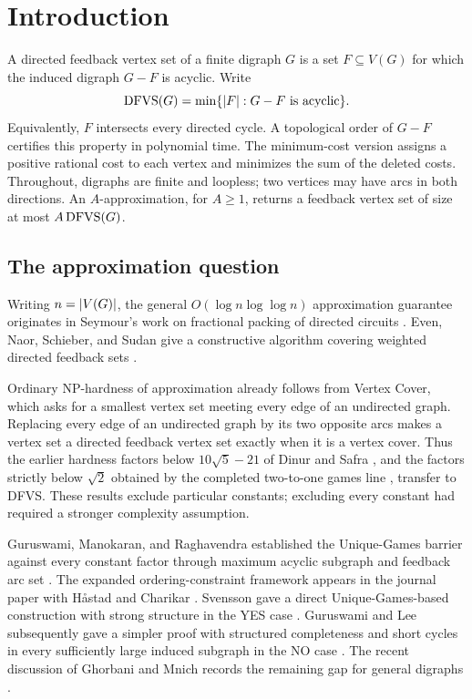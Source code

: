 \section{Introduction}\label{sec:introduction}

A directed feedback vertex set of a finite digraph $G$ is a set
$F\subseteq V(G)$ for which the induced digraph $G-F$ is acyclic. Write
\[
  \operatorname{DFVS}(G)=\min\{\lvert F\rvert:G-F\text{ is acyclic}\}.
\]
Equivalently, $F$ intersects every directed cycle. A topological order
of $G-F$ certifies this property in polynomial time. The minimum-cost
version assigns a positive rational cost to each vertex and minimizes
the sum of the deleted costs. Throughout, digraphs are finite and
loopless; two vertices may have arcs in both directions. An
$A$-approximation, for $A\ge1$, returns a feedback vertex set of
size at most $A\operatorname{DFVS}(G)$.

\subsection{The approximation question}

Writing $n=\lvert V(G)\rvert$, the general $O(\log n\log\log n)$
approximation guarantee originates
in Seymour's work on fractional packing of directed circuits
\cite{Seymour1995}. Even, Naor, Schieber, and Sudan give a constructive
algorithm covering weighted directed feedback sets \cite{Even1998}.

Ordinary NP-hardness of approximation already follows from Vertex Cover,
which asks for a smallest vertex set meeting every edge of an undirected graph.
Replacing every edge of an undirected graph by its two opposite arcs
makes a vertex set a directed feedback vertex set exactly when it is a
vertex cover. Thus the earlier hardness factors below
$10\sqrt5-21$ of Dinur and Safra \cite{DinurSafra2005}, and the factors
strictly below $\sqrt2$ obtained by the completed two-to-one games line
\cite[Section~1.3.1]{KMS2018}, transfer to DFVS. These results exclude
particular constants; excluding every constant had required a stronger
complexity assumption.

Guruswami, Manokaran, and Raghavendra established
the Unique-Games barrier against every constant factor through maximum
acyclic subgraph and feedback arc set \cite{GMR2008}. The expanded
ordering-constraint framework appears in the journal paper with
H\aa stad and Charikar \cite{GHMRC2011}. Svensson gave a direct
Unique-Games-based construction with strong structure in the YES case
\cite{Svensson2013}. Guruswami and Lee subsequently gave a simpler proof
with structured completeness and short cycles in every sufficiently
large induced subgraph in the NO case \cite{GuruswamiLee2016}.
The recent discussion of Ghorbani and Mnich records the remaining gap
for general digraphs \cite{GhorbaniMnich2026}.

